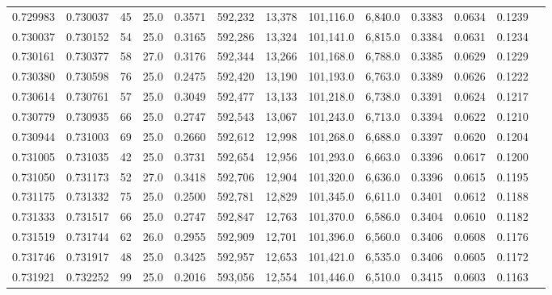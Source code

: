 \begin{tabular}{rrrrrrrrrrrrr}
0.729983 & 0.730037 &    45 & 25.0 &                                     0.3571 & 592,232 &  13,378 & 101,116.0 &   6,840.0 & 0.3383 & 0.0634 & 0.1239 \\
0.730037 & 0.730152 &    54 & 25.0 &                                     0.3165 & 592,286 &  13,324 & 101,141.0 &   6,815.0 & 0.3384 & 0.0631 & 0.1234 \\
0.730161 & 0.730377 &    58 & 27.0 &                                     0.3176 & 592,344 &  13,266 & 101,168.0 &   6,788.0 & 0.3385 & 0.0629 & 0.1229 \\
0.730380 & 0.730598 &    76 & 25.0 &                                     0.2475 & 592,420 &  13,190 & 101,193.0 &   6,763.0 & 0.3389 & 0.0626 & 0.1222 \\
0.730614 & 0.730761 &    57 & 25.0 &                                     0.3049 & 592,477 &  13,133 & 101,218.0 &   6,738.0 & 0.3391 & 0.0624 & 0.1217 \\
0.730779 & 0.730935 &    66 & 25.0 &                                     0.2747 & 592,543 &  13,067 & 101,243.0 &   6,713.0 & 0.3394 & 0.0622 & 0.1210 \\
0.730944 & 0.731003 &    69 & 25.0 &                                     0.2660 & 592,612 &  12,998 & 101,268.0 &   6,688.0 & 0.3397 & 0.0620 & 0.1204 \\
0.731005 & 0.731035 &    42 & 25.0 &                                     0.3731 & 592,654 &  12,956 & 101,293.0 &   6,663.0 & 0.3396 & 0.0617 & 0.1200 \\
0.731050 & 0.731173 &    52 & 27.0 &                                     0.3418 & 592,706 &  12,904 & 101,320.0 &   6,636.0 & 0.3396 & 0.0615 & 0.1195 \\
0.731175 & 0.731332 &    75 & 25.0 &                                     0.2500 & 592,781 &  12,829 & 101,345.0 &   6,611.0 & 0.3401 & 0.0612 & 0.1188 \\
0.731333 & 0.731517 &    66 & 25.0 &                                     0.2747 & 592,847 &  12,763 & 101,370.0 &   6,586.0 & 0.3404 & 0.0610 & 0.1182 \\
0.731519 & 0.731744 &    62 & 26.0 &                                     0.2955 & 592,909 &  12,701 & 101,396.0 &   6,560.0 & 0.3406 & 0.0608 & 0.1176 \\
0.731746 & 0.731917 &    48 & 25.0 &                                     0.3425 & 592,957 &  12,653 & 101,421.0 &   6,535.0 & 0.3406 & 0.0605 & 0.1172 \\
0.731921 & 0.732252 &    99 & 25.0 &                                     0.2016 & 593,056 &  12,554 & 101,446.0 &   6,510.0 & 0.3415 & 0.0603 & 0.1163 \\

\end{tabular}
